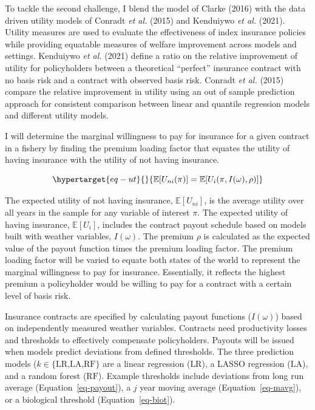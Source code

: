 \documentclass[
  letterpaper,
  DIV=11,
  numbers=noendperiod]{scrartcl}
\begin{document}
To tackle the second challenge, I blend the model of Clarke (2016) with
the data driven utility models of Conradt \emph{et al.} (2015) and
Kenduiywo \emph{et al.} (2021). Utility measures are used to evaluate
the effectiveness of index insurance policies while providing equatable
measures of welfare improvement across models and settings. Kenduiywo
\emph{et al.} (2021) define a ratio on the relative improvement of
utility for policyholders between a theoretical ``perfect'' insurance
contract with no basis risk and a contract with observed basis risk.
Conradt \emph{et al.} (2015) compare the relative improvement in utility
using an out of sample prediction approach for consistent comparison
between linear and quantile regression models and different utility
models.

I will determine the marginal willingness to pay for insurance for a
given contract in a fishery by finding the premium loading factor that
equates the utility of having insurance with the utility of not having
insurance.

\begin{equation}\protect\hypertarget{eq-ut}{}{
\mathbb{E}[U_{ni}(\pi)]=\mathbb{E}[U_{i}(\pi,I(\omega),\rho)]
}\label{eq-ut}\end{equation}

The expected utility of not having insurance, \(\mathbb{E}[U_{ni}]\), is
the average utility over all years in the sample for any variable of
interest \(\pi\). The expected utility of having insurance,
\(\mathbb{E}[U_{i}]\), includes the contract payout schedule based on
models built with weather variables, \(I(\omega)\). The premium \(\rho\)
is calculated as the expected value of the payout function times the
premium loading factor. The premium loading factor will be varied to
equate both states of the world to represent the marginal willingness to
pay for insurance. Essentially, it reflects the highest premium a
policyholder would be willing to pay for a contract with a certain level
of basis risk.

Insurance contracts are specified by calculating payout functions
(\(I(\omega)\)) based on independently measured weather variables.
Contracts need productivity losses and thresholds to effectively
compensate policyholders. Payouts will be issued when models predict
deviations from defined thresholds. The three prediction models
(\(k\in\{\text{LR,LA,RF}\}\) are a linear regression (\(\text{LR}\)), a
LASSO regression (\(\text{LA}\)), and a random forest (\(\text{RF}\)).
Example thresholds include deviations from long run average
(Equation~\ref{eq-payout}), a \(j\) year moving average
(Equation~\ref{eq-mavg}), or a biological threshold
(Equation~\ref{eq-biot}).
\end{document}
